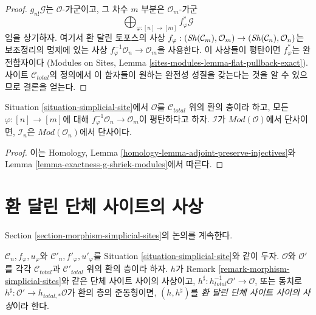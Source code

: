 \begin{proof}
$g_{n!}\mathcal{G}$는 $\mathcal{O}$-가군이고, 그 차수 $m$ 부분은
$\mathcal{O}_m$-가군
$$
\bigoplus\nolimits_{\varphi : [n] \to [m]} f_\varphi^*\mathcal{G}
$$
임을 상기하자. 여기서 환 달린 토포스의 사상\newline
$f_\varphi : (\mathop{\mathit{Sh}}\nolimits(\mathcal{C}_m), \mathcal{O}_m) \to
(\mathop{\mathit{Sh}}\nolimits(\mathcal{C}_n), \mathcal{O}_n)$는 보조정리의 명제에 있는 사상
$f_\varphi^{-1}\mathcal{O}_n \to \mathcal{O}_m$을 사용한다.
이 사상들이 평탄이면 $f_\varphi^*$는 완전함자이다
(Modules on Sites, Lemma \ref{sites-modules-lemma-flat-pullback-exact}).
사이트 $\mathcal{C}_{total}$의 정의에서 이 함자들이 원하는 완전성 성질을
갖는다는 것을 알 수 있으므로 결론을 얻는다.
\end{proof}

\begin{lemma}
\label{lemma-restriction-injective-to-component-site-module}
Situation \ref{situation-simplicial-site}에서 $\mathcal{O}$를
$\mathcal{C}_{total}$ 위의 환의 층이라 하고, 모든
$\varphi : [n] \to [m]$에 대해
$f_\varphi^{-1}\mathcal{O}_n \to \mathcal{O}_m$이 평탄하다고 하자.
$\mathcal{I}$가 $\textit{Mod}(\mathcal{O})$에서 단사이면,
$\mathcal{I}_n$은 $\textit{Mod}(\mathcal{O}_n)$에서 단사이다.
\end{lemma}

\begin{proof}
이는 Homology, Lemma
\ref{homology-lemma-adjoint-preserve-injectives}와
Lemma \ref{lemma-exactness-g-shriek-modules}에서 따른다.
\end{proof}


\section{환 달린 단체 사이트의 사상}
\label{section-morphism-simplicial-sites-modules}

\noindent
Section \ref{section-morphism-simplicial-sites}의 논의를 계속한다.

\begin{remark}
\label{remark-morphism-simplicial-sites-modules}
$\mathcal{C}_n, f_\varphi, u_\varphi$와
$\mathcal{C}'_n, f'_\varphi, u'_\varphi$를 Situation
\ref{situation-simplicial-site}와 같이 두자.
$\mathcal{O}$와 $\mathcal{O}'$를 각각 $\mathcal{C}_{total}$과
$\mathcal{C}'_{total}$ 위의 환의 층이라 하자. $h$가 Remark
\ref{remark-morphism-simplicial-sites}와 같은 단체 사이트 사이의 사상이고,
$h^\sharp : h_{total}^{-1}\mathcal{O}' \to \mathcal{O}$,
또는 동치로 $h^\sharp : \mathcal{O}' \to h_{total, *}\mathcal{O}$가
환의 층의 준동형이면, $(h, h^\sharp)$를
{\it 환 달린 단체 사이트 사이의 사상}이라 한다.
\end{remark}

